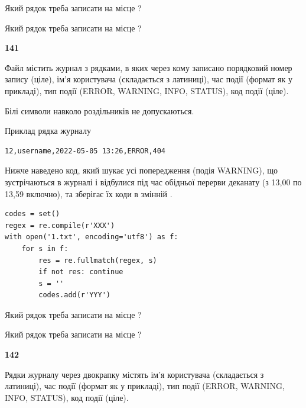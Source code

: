 Який рядок треба записати на місце  ?\par
\vspace{5mm}


Який рядок треба записати на місце  ?\par


\newpage

{\begin {center}\textbf{ 141}\end {center}}\par
Файл  містить журнал з рядками, в яких через кому записано поряд\-ко\-вий номер запису (ціле), ім'я користувача (складається з латиниці), час події (фор\-мат як у прикладі), тип події (ERROR, WARNING, INFO, STATUS), код події (ціле).

Білі символи навколо роздільників не допускаються.

Приклад рядка журналу



\begin{verbatim}
12,username,2022-05-05 13:26,ERROR,404
\end{verbatim}


Нижче наведено код, який шукає усі попередження (подія WARNING), що зустрі\-ча\-ються в журналі і відбулися під час обідньої перерви деканату (з 13,00 по 13,59 включно), та зберігає їх коди в змінній .



\begin{verbatim}
codes = set()
regex = re.compile(r'XXX')
with open('1.txt', encoding='utf8') as f:
    for s in f:
        res = re.fullmatch(regex, s)
        if not res: continue
        s = ''
        codes.add(r'YYY')
\end{verbatim}







Який рядок треба записати на місце  ?\par
\vspace{5mm}


Який рядок треба записати на місце  ?\par


\newpage

{\begin {center}\textbf{ 142}\end {center}}\par
Рядки журналу через двокрапку містять ім'я користувача (складається з латиниці), час події (фор\-мат як у прикладі), тип події (ERROR, WARNING, INFO, STATUS), код події (ціле).

